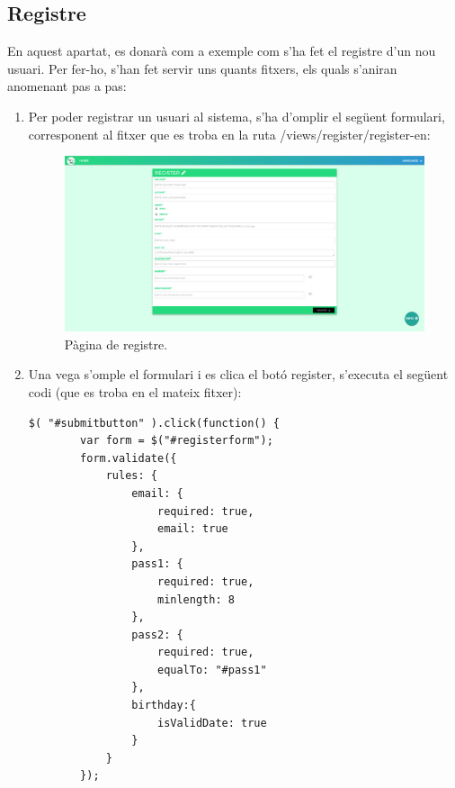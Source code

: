\documentclass[11pt,catalan,listoffigures,listoftables]{tfgetsinf}
\begin{document}
\subsection{Registre}
En aquest apartat, es donarà com a exemple com s'ha fet el registre d'un nou usuari. Per fer-ho, s'han fet servir uns quants fitxers, els quals s'aniran anomenant pas a pas:
\newpage
\begin{enumerate}
	\item Per poder registrar un usuari al sistema, s'ha d'omplir el següent formulari, corresponent al fitxer que es troba en la ruta /views/register/register-en:
\begin{figure}[h]
\includegraphics[width=15cm]{images/image13}
\centering
\caption[Figura 4.8]{Pàgina de registre.}
\centering
\end{figure}
\item Una vega s'omple el formulari i es clica el botó register, s'executa el següent codi (que es troba en el mateix fitxer):
\begin{lstlisting}
$( "#submitbutton" ).click(function() {
        var form = $("#registerform");
        form.validate({
            rules: {
                email: {
                    required: true,
                    email: true
                },
                pass1: {
                    required: true,
                    minlength: 8
                },
                pass2: {
                    required: true,
                    equalTo: "#pass1"
                },
                birthday:{
                    isValidDate: true
                }
            }
        });


\end{lstlisting}
\end{enumerate}
\end{document}

